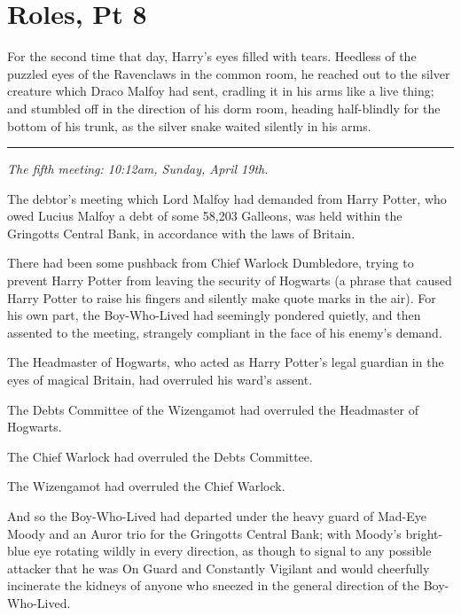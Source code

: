 \chapter{Roles, Pt 8}\label{roles-pt-8}

For the second time that day, Harry's eyes filled with tears. Heedless
of the puzzled eyes of the Ravenclaws in the common room, he reached out
to the silver creature which Draco Malfoy had sent, cradling it in his
arms like a live thing; and stumbled off in the direction of his dorm
room, heading half-blindly for the bottom of his trunk, as the silver
snake waited silently in his arms.

\begin{center}\rule{3in}{0.4pt}\end{center}

\emph{The fifth meeting: 10:12am, Sunday, April 19th.}

The debtor's meeting which Lord Malfoy had demanded from Harry Potter,
who owed Lucius Malfoy a debt of some 58,203 Galleons, was held within
the Gringotts Central Bank, in accordance with the laws of Britain.

There had been some pushback from Chief Warlock Dumbledore, trying to
prevent Harry Potter from leaving the security of Hogwarts (a phrase
that caused Harry Potter to raise his fingers and silently make quote
marks in the air). For his own part, the Boy-Who-Lived had seemingly
pondered quietly, and then assented to the meeting, strangely compliant
in the face of his enemy's demand.

The Headmaster of Hogwarts, who acted as Harry Potter's legal guardian
in the eyes of magical Britain, had overruled his ward's assent.

The Debts Committee of the Wizengamot had overruled the Headmaster of
Hogwarts.

The Chief Warlock had overruled the Debts Committee.

The Wizengamot had overruled the Chief Warlock.

And so the Boy-Who-Lived had departed under the heavy guard of Mad-Eye
Moody and an Auror trio for the Gringotts Central Bank; with Moody's
bright-blue eye rotating wildly in every direction, as though to signal
to any possible attacker that he was On Guard and Constantly Vigilant
and would cheerfully incinerate the kidneys of anyone who sneezed in the
general direction of the Boy-Who-Lived.


